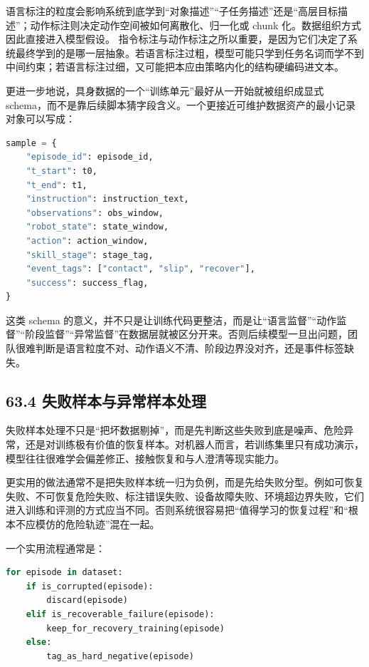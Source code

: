 语言标注的粒度会影响系统到底学到“对象描述”“子任务描述”还是“高层目标描述”；动作标注则决定动作空间被如何离散化、归一化或 chunk 化。数据组织方式因此直接进入模型假设。 指令标注与动作标注之所以重要，是因为它们决定了系统最终学到的是哪一层抽象。若语言标注过粗，模型可能只学到任务名词而学不到中间约束；若语言标注过细，又可能把本应由策略内化的结构硬编码进文本。

更进一步地说，具身数据的一个“训练单元”最好从一开始就被组织成显式 schema，而不是靠后续脚本猜字段含义。一个更接近可维护数据资产的最小记录对象可以写成：

\begin{lstlisting}[language=python]
sample = {
    "episode_id": episode_id,
    "t_start": t0,
    "t_end": t1,
    "instruction": instruction_text,
    "observations": obs_window,
    "robot_state": state_window,
    "action": action_window,
    "skill_stage": stage_tag,
    "event_tags": ["contact", "slip", "recover"],
    "success": success_flag,
}
\end{lstlisting}

这类 schema 的意义，并不只是让训练代码更整洁，而是让“语言监督”“动作监督”“阶段监督”“异常监督”在数据层就被区分开来。否则后续模型一旦出问题，团队很难判断是语言粒度不对、动作语义不清、阶段边界没对齐，还是事件标签缺失。

\subsection*{63.4 失败样本与异常样本处理}


失败样本处理不只是“把坏数据剔掉”，而是先判断这些失败到底是噪声、危险异常，还是对训练极有价值的恢复样本。对机器人而言，若训练集里只有成功演示，模型往往很难学会偏差修正、接触恢复和与人澄清等现实能力。

更实用的做法通常不是把失败样本统一归为负例，而是先给失败分型。例如可恢复失败、不可恢复危险失败、标注错误失败、设备故障失败、环境超边界失败，它们进入训练和评测的方式应当不同。否则系统很容易把“值得学习的恢复过程”和“根本不应模仿的危险轨迹”混在一起。

一个实用流程通常是：

\begin{lstlisting}[language=python]
for episode in dataset:
    if is_corrupted(episode):
        discard(episode)
    elif is_recoverable_failure(episode):
        keep_for_recovery_training(episode)
    else:
        tag_as_hard_negative(episode)
\end{lstlisting}

